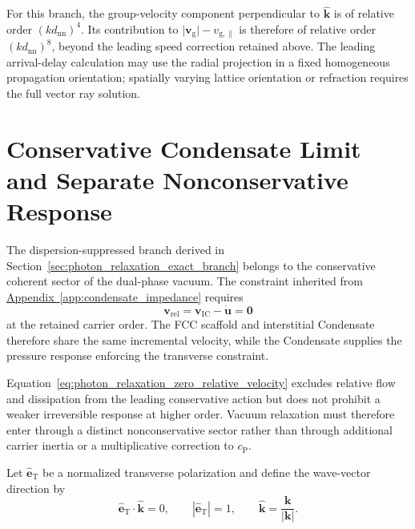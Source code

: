 For this branch, the group-velocity component perpendicular to
\(\widehat{\mathbf k}\) is of relative order
\((kd_{\mathrm{nn}})^4\). Its contribution to
\(\lvert\mathbf v_{\mathrm g}\rvert-v_{\mathrm{g},\parallel}\) is therefore
of relative order \((kd_{\mathrm{nn}})^8\), beyond the leading speed
correction retained above. The leading arrival-delay calculation may use
the radial projection in a fixed homogeneous propagation orientation;
spatially varying lattice orientation or refraction requires the full vector
ray solution.


\section{Conservative Condensate Limit and Separate Nonconservative Response}
\label{sec:photon_relaxation_condensate_completion}

The dispersion-suppressed branch derived in
Section~\ref{sec:photon_relaxation_exact_branch} belongs to the conservative
coherent sector of the dual-phase vacuum. The constraint inherited from
\hyperref[app:condensate_impedance]{Appendix~\ref*{app:condensate_impedance}}
requires
\begin{equation}
    \mathbf v_{\mathrm{rel}}
    =
    \mathbf v_{\mathrm{IC}}
    -
    \dot{\mathbf u}
    =
    \mathbf 0
    \label{eq:photon_relaxation_zero_relative_velocity}
\end{equation}
at the retained carrier order. The FCC scaffold and interstitial Condensate
therefore share the same incremental velocity, while the Condensate supplies
the pressure response enforcing the transverse constraint.

Equation~\eqref{eq:photon_relaxation_zero_relative_velocity} excludes
relative flow and dissipation from the leading conservative action but does
not prohibit a weaker irreversible response at higher order. Vacuum
relaxation must therefore enter through a distinct nonconservative sector
rather than through additional carrier inertia or a multiplicative correction
to \(c_{\mathrm P}\).

Let \(\widehat{\mathbf e}_{\mathrm T}\) be a normalized transverse
polarization and define the wave-vector direction by
\begin{equation}
    \widehat{\mathbf e}_{\mathrm T}
    \cdot
    \widehat{\mathbf k}
    =
    0,
    \qquad
    \left|
        \widehat{\mathbf e}_{\mathrm T}
    \right|
    =
    1,
    \qquad
    \widehat{\mathbf k}
    =
    \frac{\mathbf k}{|\mathbf k|}.
    \label{eq:photon_relaxation_transverse_polarization}
\end{equation}

